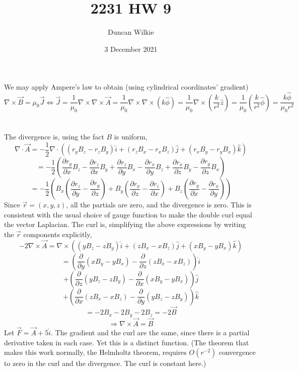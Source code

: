 \documentclass{article}
\title{2231 HW 9}
\author{Duncan Wilkie}
\date{3 December 2021}
\begin{document}
\maketitle

\section{}
We may apply Ampere's law to obtain (using cylindrical coordinates' gradient)
\[\nabla \times \vec{B}=\mu_0\vec{J}\Leftrightarrow \vec{J}=\frac{1}{\mu_0}\nabla\times\nabla\times\vec{A}=\frac{1}{\mu_0}\nabla\times\nabla\times(k\hat{\phi})=\frac{1}{\mu_0}\nabla\times\left(\frac{k}{r^2}\hat{z}\right)=\frac{1}{\mu_0}\left( \frac{k}{r^2}\hat{\phi} \right)=\frac{k\hat{\phi}}{{\mu_0r^2}}\]
\section{}
The divergence is, using the fact $B$ is uniform,
\[\nabla\cdot\vec{A}=-\frac{1}{2}\nabla\cdot\left( (r_yB_z-r_zB_y)\hat{i}+(r_zB_x-r_xB_z)\hat{j}+(r_xB_y-r_yB_x)\hat{k}\right)\]
\[=-\frac{1}{2}\left(\frac{\partial r_y}{\partial x}B_z-\frac{\partial r_z}{\partial x}B_y +\frac{\partial r_z}{\partial y}B_x-\frac{\partial r_x}{\partial y}B_z+\frac{\partial r_x}{\partial z}B_y-\frac{\partial r_y}{\partial z}B_x\right)\]
\[=-\frac{1}{2}\left( B_x\left( \frac{\partial r_z}{\partial y}-\frac{\partial r_y}{\partial z} \right)+B_y\left( \frac{\partial r_x}{\partial z}-\frac{\partial r_z}{\partial x} \right)+B_z\left( \frac{\partial r_y}{\partial x}-\frac{\partial r_x}{\partial y} \right) \right)\]
Since $\vec{r}=(x,y,z)$, all the partials are zero, and the divergence is zero. This is consistent with the usual choice of gauge function to make the double curl equal the vector Laplacian.
The curl is, simplifying the above expressions by writing the $\vec{r}$ components explicitly,
\[-2\nabla\times \vec{A}=\nabla\times\left( (yB_z-zB_y)\hat{i}+(zB_x-xB_z)\hat{j}+(xB_y-yB_x)\hat{k}\right)\]
\[=\left( \frac{\partial}{\partial y}\left( xB_y-yB_x \right)-\frac{\partial}{\partial z}\left( zB_x-xB_z \right) \right)\hat{i}\]\[+\left( \frac{\partial}{\partial z}\left( yB_z-zB_y \right)-\frac{\partial}{\partial x}\left( xB_y-yB_x \right) \right)\hat{j}\]\[+\left( \frac{\partial}{\partial x}\left( zB_x-xB_z \right)-\frac{\partial}{\partial y}\left( yB_z-zB_y \right) \right)\hat{k}\]
\[=-2B_x-2B_y-2B_z=-2\vec{B}\]
\[\Rightarrow \nabla\times \vec{A}=\vec{B}\]
Let $\vec{F}=\vec{A}+5\hat{i}$. The gradient and the curl are the same, since there is a partial derivative taken in each case. Yet this is a distinct function. (The theorem that makes this work normally, the Helmholtz theorem, requires $O(r^{-2})$ convergence to zero in the curl and the divergence. The curl is constant here.)
\end{document}
